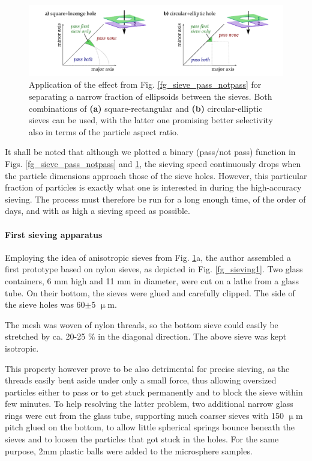 \begin{figure}[ht] \caption{Application of the effect from Fig. \ref{fg_sieve_pass_notpass} for separating a narrow fraction of ellipsoids between the sieves. Both combinations of \textbf{(a)} square-rectangular and \textbf{(b)} circular-elliptic sieves can be used, with the latter one promising better selectivity also in terms of the particle aspect ratio.} \label{fg_double_sieving} \centering 
\includegraphics[width=\textwidth]{img/technology/sieve_double_sieving_fractions.pdf}
\end{figure}
It shall be noted that although we plotted a binary (pass/not pass) function in Figs. \ref{fg_sieve_pass_notpass} and \ref{fg_double_sieving}, the sieving speed continuously drops when the particle dimensions approach those of the sieve holes. 
However, this particular fraction of particles is exactly what one is interested in during the high-accuracy sieving. The process must therefore be run for a long enough time, of the order of days, and with as high a sieving speed as possible.
\paragraph{First sieving apparatus}%
Employing the idea of anisotropic sieves from Fig. \ref{fg_double_sieving}a, the author assembled a first prototype based on nylon sieves, as depicted in Fig. \ref{fg_sieving1}. Two glass containers, 6 mm high and 11 mm in diameter, were cut on a lathe from a glass tube. On their bottom, the sieves were glued and carefully clipped. The side of the sieve holes was 60$\pm$5 $\upmu$m. 

The mesh was woven of nylon threads, so the bottom sieve could easily be stretched by ca. 20-25 \% in the diagonal direction.  The above sieve was kept isotropic. 

This  property however prove to be also detrimental for precise sieving, as the threads easily bent aside under only a small force, thus allowing oversized particles either to pass or to get stuck permanently and to block the sieve within few minutes. To help resolving the latter problem, two additional narrow glass rings were cut from the glass tube, supporting much coarser sieves with 150 $\upmu$m pitch glued on the bottom, to allow little spherical springs bounce beneath the sieves and to loosen the particles that got stuck in the holes. For the same purpose, 2mm plastic balls were added to the microsphere samples.  

